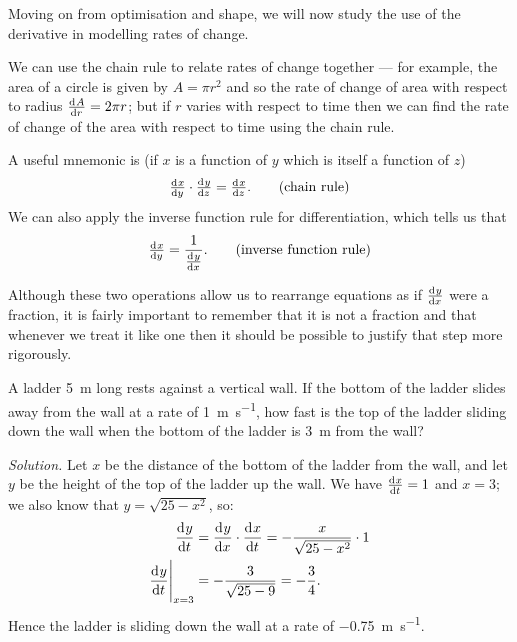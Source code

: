 


Moving on from optimisation and shape, we will now study the use of the derivative in modelling rates of change.

We can use the chain rule to relate rates of change together --- for example, the area of a circle is given by $ A = \pi r^2 $
and so the rate of change of area with respect to radius $ \od{A}{r} = 2\pi r $; but if $ r $ varies with respect to time then
we can find the rate of change of the area with respect to time using the chain rule.

A useful mnemonic is (if $ x $ is a function of $ y $ which is itself a function of $ z $)
\begin{equation}
  \od{x}{y} \cdot \od{y}{z} = \od{x}{z}. \tag{chain rule}
\end{equation}
We can also apply the inverse function rule for differentiation, which tells us that
\begin{equation}
  \od{x}{y} = \frac{1}{\od{y}{x}}. \tag{inverse function rule}
\end{equation}

Although these two operations allow us to rearrange equations as if $ \od{y}{x} $ were a fraction, it is
fairly important to remember that it is not a fraction and that whenever we treat it like one then it should
be possible to justify that step more rigorously.

\begin{ex}
  A ladder \SI{5}{\metre} long rests against a vertical wall. If the bottom of the ladder slides away
  from the wall at a rate of \SI{1}{\metre\per\second}, how fast is the top of the ladder sliding down the
  wall when the bottom of the ladder is \SI{3}{\metre} from the wall?

  \textit{Solution.} Let $ x $ be the distance of the bottom of the ladder from the wall, and let $ y $
  be the height of the top of the ladder up the wall. We have $ \od{x}{t} = 1 $ and $ x = 3 $; we also
  know that $ y = \sqrt{25 - x^2} $, so:
  \begin{align*}
    \dod{y}{t} &= \dod{y}{x} \cdot \dod{x}{t} = -\frac{x}{\sqrt{25 - x^2}} \cdot 1\\
    \eval{\dod{y}{t}}_{x = 3} &= -\frac{3}{\sqrt{25 - 9}} = -\frac{3}{4}.
  \end{align*}
  Hence the ladder is sliding down the wall at a rate of \SI{-0.75}{\metre\per\second}.
\end{ex}

